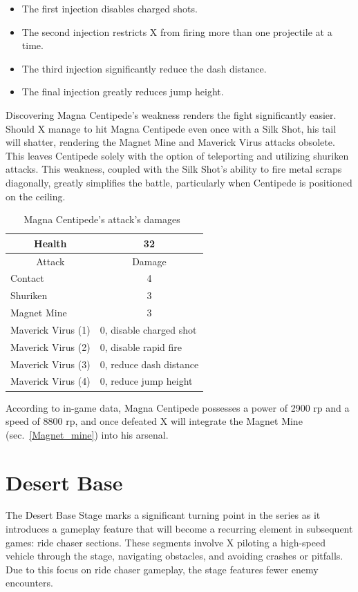 \begin{itemize}
\item The first injection disables charged shots.
\item  The second injection restricts X from firing more than one projectile at a time.
\item The third injection significantly reduce the dash distance.
\item The final injection greatly reduces jump height.
\end{itemize}

Discovering Magna Centipede's weakness renders the fight significantly easier. Should X manage to hit Magna Centipede even once with a Silk Shot, his tail will shatter, rendering the Magnet Mine and Maverick Virus attacks obsolete. This leaves Centipede solely with the option of teleporting and utilizing shuriken attacks. This weakness, coupled with the Silk Shot's ability to fire metal scraps diagonally, greatly simplifies the battle, particularly when Centipede is positioned on the ceiling.

\begin{table}[htp]
	\centering
	\begin{tabular}[h]{l c}
		\toprule
		\multicolumn{1}{c}{Health}  & 32 \\
		\midrule
		\multicolumn{1}{c}{Attack} & \multicolumn{1}{c}{Damage}\\
		Contact & 4 \\
		Shuriken & 3\\
		Magnet Mine& 3\\
		Maverick Virus (1) & \multicolumn{1}{l}{0, disable charged shot}\\
		Maverick Virus (2) & \multicolumn{1}{l}{0, disable rapid fire}\\
		Maverick Virus (3) & \multicolumn{1}{l}{0, reduce dash distance}\\
		Maverick Virus (4) & \multicolumn{1}{l}{0, reduce jump height}\\
		\bottomrule
	\end{tabular}
	\caption{Magna Centipede's attack's damages~\cite{wiki:Magna_centipede}}
\end{table}
According to in-game data, Magna Centipede possesses a power of 2900 rp and a speed of 8800 rp, and once defeated X will integrate the Magnet Mine (sec.~\ref{Magnet_mine}) into his arsenal.



\section{Desert Base}
The Desert Base Stage marks a significant turning point in the series as it introduces a gameplay feature that will become a recurring element in subsequent games: ride chaser sections. These segments involve X piloting a high-speed vehicle through the stage, navigating obstacles, and avoiding crashes or pitfalls. Due to this focus on ride chaser gameplay, the stage features fewer enemy encounters.

